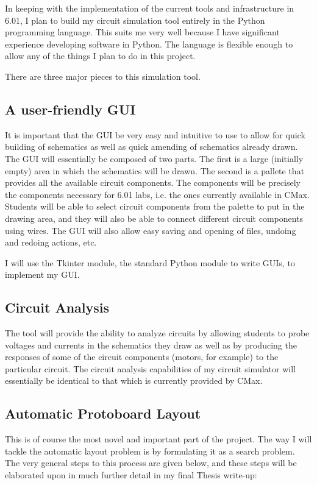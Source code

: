 \documentclass[12pt, doublespacing]{amsart}
\begin{document}
In keeping with the implementation of the current tools and infrastructure in 6.01, I plan to build my circuit simulation tool entirely in the Python programming language. This suits me very well because I have significant experience developing software in Python. The language is flexible enough to allow any of the things I plan to do in this project.

There are three major pieces to this simulation tool.

\subsection{A user-friendly GUI}

It is important that the GUI be very easy and intuitive to use to allow for quick building of schematics as well as quick amending of schematics already drawn. The GUI will essentially be composed of two parts. The first is a large (initially empty) area in which the schematics will be drawn. The second is a pallete that provides all the available circuit components. The components will be precisely the components necessary for 6.01 labs, i.e. the ones currently available in CMax. Students will be able to select circuit components from the palette to put in the drawing area, and they will also be able to connect different circuit components using wires. The GUI will also allow easy saving and opening of files, undoing and redoing actions, etc.

I will use the Tkinter module, the standard Python module to write GUIs, to implement my GUI\cite{tkinter}.

\subsection{Circuit Analysis}

The tool will provide the ability to analyze circuits by allowing students to probe voltages and currents in the schematics they draw as well as by producing the responses of some of the circuit components (motors, for example) to the particular circuit. The circuit analysis capabilities of my circuit simulator will essentially be identical to that which is currently provided by CMax.

\subsection{Automatic Protoboard Layout}

This is of course the most novel and important part of the project. The way I will tackle the automatic layout problem is by formulating it as a search problem. The very general steps to this process are given below, and these steps will be elaborated upon in much further detail in my final Thesis write-up:
\end{document}
